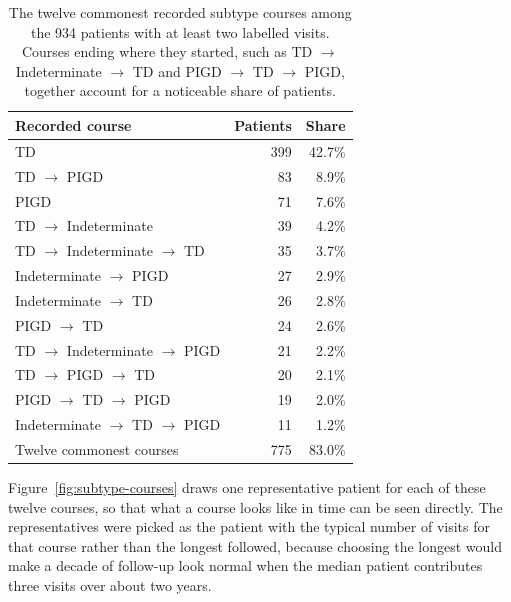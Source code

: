 \documentclass[11pt,a4paper]{article}
\begin{document}
\begin{table}[H]
\centering
\begin{tabular}{@{}lrr@{}}
\toprule
\textbf{Recorded course} & \textbf{Patients} & \textbf{Share} \\
\midrule
TD                                                               & 399 & 42.7\% \\
TD $\rightarrow$ PIGD                                            & \phantom{0}83 & \phantom{0}8.9\% \\
PIGD                                                             & \phantom{0}71 & \phantom{0}7.6\% \\
TD $\rightarrow$ Indeterminate                                   & \phantom{0}39 & \phantom{0}4.2\% \\
TD $\rightarrow$ Indeterminate $\rightarrow$ TD                  & \phantom{0}35 & \phantom{0}3.7\% \\
Indeterminate $\rightarrow$ PIGD                                 & \phantom{0}27 & \phantom{0}2.9\% \\
Indeterminate $\rightarrow$ TD                                   & \phantom{0}26 & \phantom{0}2.8\% \\
PIGD $\rightarrow$ TD                                            & \phantom{0}24 & \phantom{0}2.6\% \\
TD $\rightarrow$ Indeterminate $\rightarrow$ PIGD                & \phantom{0}21 & \phantom{0}2.2\% \\
TD $\rightarrow$ PIGD $\rightarrow$ TD                           & \phantom{0}20 & \phantom{0}2.1\% \\
PIGD $\rightarrow$ TD $\rightarrow$ PIGD                         & \phantom{0}19 & \phantom{0}2.0\% \\
Indeterminate $\rightarrow$ TD $\rightarrow$ PIGD                & \phantom{0}11 & \phantom{0}1.2\% \\
\midrule
Twelve commonest courses                                         & 775 & 83.0\% \\
\bottomrule
\end{tabular}
\caption{The twelve commonest recorded subtype courses among the 934 patients
with at least two labelled visits. Courses ending where they started, such as
TD $\rightarrow$ Indeterminate $\rightarrow$ TD and PIGD $\rightarrow$ TD
$\rightarrow$ PIGD, together account for a noticeable share of patients.}
\label{tab:courses}
\end{table}

Figure~\ref{fig:subtype-courses} draws one representative patient for each of
these twelve courses, so that what a course looks like in time can be seen
directly. The representatives were picked as the patient with the typical number
of visits for that course rather than the longest followed, because choosing the
longest would make a decade of follow-up look normal when the median patient
contributes three visits over about two years.
\end{document}
